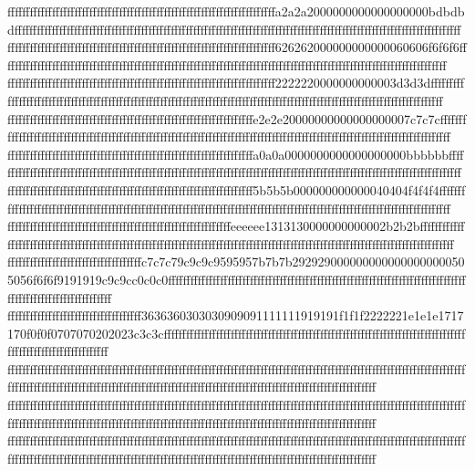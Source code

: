 {{{ffffffffffffffffffffffffffffffffffffffffffffffffffffffffffffffffffffffffa2a2a2000000000000000000bdbdbdffffffffffffffffffffffffffffffffffffffffffffffffffffffffffffffffffffffffffffffffffffffffffffffffffffffffffffffffffffffff
ffffffffffffffffffffffffffffffffffffffffffffffffffffffffffffffffffffffff626262000000000000060606f6f6f6ffffffffffffffffffffffffffffffffffffffffffffffffffffffffffffffffffffffffffffffffffffffffffffffffffffffffffffffffffffffff
ffffffffffffffffffffffffffffffffffffffffffffffffffffffffffffffffffffffff2222220000000000003d3d3dffffffffffffffffffffffffffffffffffffffffffffffffffffffffffffffffffffffffffffffffffffffffffffffffffffffffffffffffffffffffffffff
ffffffffffffffffffffffffffffffffffffffffffffffffffffffffffffffffffe2e2e20000000000000000007c7c7cffffffffffffffffffffffffffffffffffffffffffffffffffffffffffffffffffffffffffffffffffffffffffffffffffffffffffffffffffffffffffffff
ffffffffffffffffffffffffffffffffffffffffffffffffffffffffffffffffffa0a0a0000000000000000000bbbbbbffffffffffffffffffffffffffffffffffffffffffffffffffffffffffffffffffffffffffffffffffffffffffffffffffffffffffffffffffffffffffffff
ffffffffffffffffffffffffffffffffffffffffffffffffffffffffffffffffff5b5b5b000000000000040404f4f4f4ffffffffffffffffffffffffffffffffffffffffffffffffffffffffffffffffffffffffffffffffffffffffffffffffffffffffffffffffffffffffffffff
ffffffffffffffffffffffffffffffffffffffffffffffffffffffffffffeeeeee1313130000000000002b2b2bffffffffffffffffffffffffffffffffffffffffffffffffffffffffffffffffffffffffffffffffffffffffffffffffffffffffffffffffffffffffffffffffffff
ffffffffffffffffffffffffffffffffffffc7c7c79c9c9c9595957b7b7b2929290000000000000000000505056f6f6f9191919c9c9cc0c0c0ffffffffffffffffffffffffffffffffffffffffffffffffffffffffffffffffffffffffffffffffffffffffffffffffffffffffffff
ffffffffffffffffffffffffffffffffffff3636360303030909091111111919191f1f1f2222221e1e1e1717170f0f0f0707070202023c3c3cffffffffffffffffffffffffffffffffffffffffffffffffffffffffffffffffffffffffffffffffffffffffffffffffffffffffffff
ffffffffffffffffffffffffffffffffffffffffffffffffffffffffffffffffffffffffffffffffffffffffffffffffffffffffffffffffffffffffffffffffffffffffffffffffffffffffffffffffffffffffffffffffffffffffffffffffffffffffffffffffffffffffffffff
ffffffffffffffffffffffffffffffffffffffffffffffffffffffffffffffffffffffffffffffffffffffffffffffffffffffffffffffffffffffffffffffffffffffffffffffffffffffffffffffffffffffffffffffffffffffffffffffffffffffffffffffffffffffffffffff
ffffffffffffffffffffffffffffffffffffffffffffffffffffffffffffffffffffffffffffffffffffffffffffffffffffffffffffffffffffffffffffffffffffffffffffffffffffffffffffffffffffffffffffffffffffffffffffffffffffffffffffffffffffffffffffff
}}}
